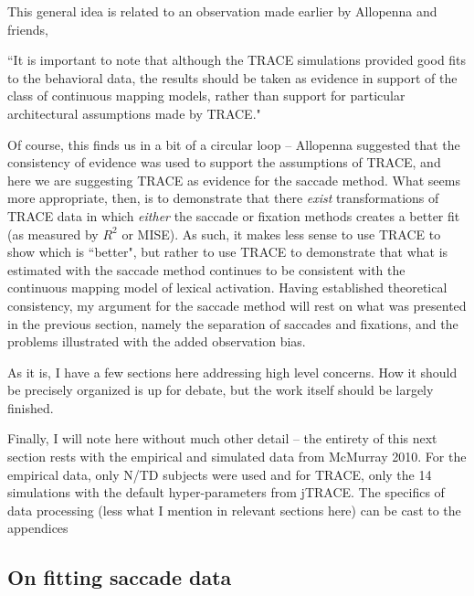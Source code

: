 \documentclass{article}
\begin{document}
This general idea is related to an observation made earlier by Allopenna and friends, 

``It is important to note that although the TRACE simulations provided good fits to the behavioral data, the results should be taken as evidence in support of the class of continuous mapping models, rather than support for particular architectural assumptions made by TRACE."

Of course, this finds us in a bit of a circular loop -- Allopenna suggested that the consistency of evidence was used to support the assumptions of TRACE, and here we are suggesting TRACE as evidence for the saccade method. What seems more appropriate, then, is to demonstrate that there \textit{exist} transformations of TRACE data in which \textit{either} the saccade or fixation methods creates a better fit (as measured by $R^2$ or MISE). As such, it makes less sense to use TRACE to show which is ``better", but rather to use TRACE to demonstrate that what is estimated with the saccade method continues to be consistent with the continuous mapping model of lexical activation. Having established theoretical consistency, my argument for the saccade method will rest on what was presented in the previous section, namely the separation of saccades and fixations, and the problems illustrated with the added observation bias. 

As it is, I have a few sections here addressing high level concerns. How it should be precisely organized is up for debate, but the work itself should be largely finished.

Finally, I will note here without much other detail -- the entirety of this next section rests with the empirical and simulated data from McMurray 2010. For the empirical data, only N/TD subjects were used and for TRACE, only the 14 simulations with the default hyper-parameters from jTRACE. The specifics of data processing (less what I mention in relevant sections here) can be cast to the appendices

\subsection{On fitting saccade data}
\end{document}
